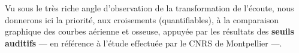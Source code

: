 Vu sous le très riche angle d'observation de la transformation de l'écoute, 
nous
donnerons ici la priorité, aux croisements (quantifiables), à la comparaison graphique
des courbes aérienne et osseuse, appuyée  par les résultats
des \textbf{seuils auditifs} --- en référence à
  l'étude effectuée par le CNRS de Montpellier\autocite{affectiveDisorders} ---.
